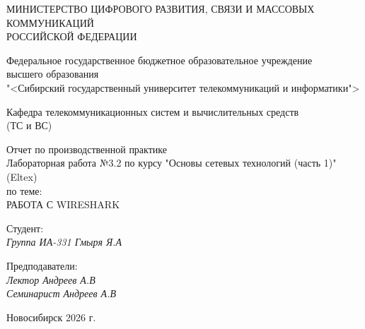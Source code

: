\thispagestyle{empty}

\begin{center}
    МИНИСТЕРСТВО ЦИФРОВОГО РАЗВИТИЯ, СВЯЗИ И МАССОВЫХ КОММУНИКАЦИЙ \\ РОССИЙСКОЙ ФЕДЕРАЦИИ

    \vspace{20pt}

    Федеральное государственное бюджетное образовательное учреждение  \\  высшего образования \\
    "<Сибирский государственный университет телекоммуникаций и информатики"> \\

    \vspace{20pt}

    Кафедра телекоммуникационных систем и вычислительных средств \\  (ТС и ВС)
\end{center}

\vfill

\begin{center}
    Отчет по производственной практике \\  
    Лабораторная работа №3.2 по курсу "Основы сетевых технологий (часть 1)" (Eltex) \\
    \vspace{20pt}
    по теме: \\
    \uppercase{Работа с Wireshark}
\end{center}

\vfill

    \noindent Студент: \\
    \textit{Группа ИА-331 \hfill Гмыря Я.А}

    \vspace{20pt}

    \noindent Предподаватели: \\
    \textit{Лектор \hfill Андреев А.В} \\
    \textit{Семинарист \hfill Андреев А.В}

\vfill

\begin{center}
    Новосибирск 2026 г.
\end{center}